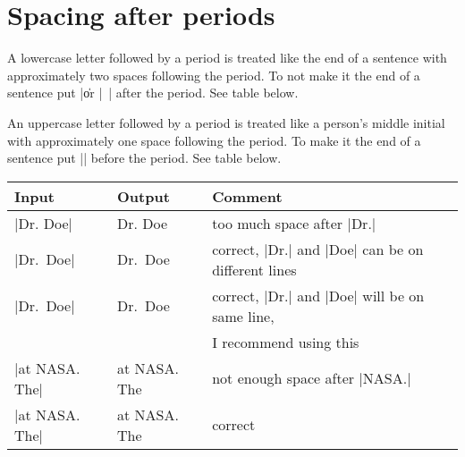 {
  \DefineShortVerb{\;}  %
  \setlength{\tabcolsep}{9pt}
  \noindent
  \hspace*{\parindent}
}


\section{Spacing after periods}

A lowercase letter followed by a period
is treated like the end of a sentence
with approximately two spaces following the period.
To not make it the end of a sentence put |\|
or |~| after the period.
See table below.

An uppercase letter followed by a period
is treated like a person's middle initial
with approximately one space following the period.
To make it the end of a sentence put |\@|
before the period.
See table below.

\begin{inlinetable}
  \begin{tabular}{@{}lll@{}}
    \toprule
    \textbf{Input}& \textbf{Output}& \textbf{Comment}\\
    \midrule
    \noalign{\vspace{2pt}}
    |Dr. Doe|&  Dr. Doe&  too much space after |Dr.|\\
    |Dr.\ Doe|& Dr.\ Doe& correct, |Dr.| and |Doe| can be on different lines\\
    |Dr.~Doe|&  Dr.~Doe&  correct, |Dr.| and |Doe| will be on same line,\\
    & & I recommend using this\\
    \noalign{\vspace{6pt}}
    |at NASA.  The|&   at NASA.  The&   not enough space after |NASA.|\\
    |at NASA\@.  The|& at NASA\@.  The& correct\\
    \bottomrule
  \end{tabular}
  \index{\verb*+\ +}
\end{inlinetable}


